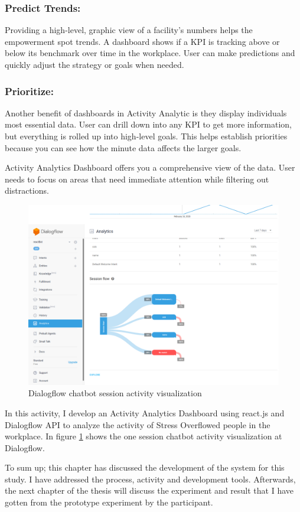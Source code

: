\subsubsection*{Predict Trends:}
Providing a high-level, graphic view of a facility’s numbers helps the empowerment spot trends. A dashboard shows if a \acs{KPI} is tracking above or below its benchmark over time in the workplace. User can make predictions and quickly adjust the strategy or goals when needed.
\subsubsection*{Prioritize:}
Another benefit of dashboards in Activity Analytic is they display individuals most essential data. User can drill down into any \acs{KPI} to get more information, but everything is rolled up into high-level goals. This helps establish priorities because you can see how the minute data affects the larger goals.

Activity Analytics Dashboard offers you a comprehensive view of the data. User needs to focus on areas that need immediate attention while filtering out distractions.

\begin{figure}[hbt!] 
  \centering
  \includegraphics[width=1.0\linewidth]{chap4/image4/flow2.png}
  \caption[Dialogflow chatbot session activity visualization ]{Dialogflow chatbot session activity visualization}
  \label{fig:flow2}
\end{figure}

In this activity, I develop an Activity Analytics Dashboard using react.js and Dialogflow API to analyze the activity of Stress Overflowed people in the workplace.  In figure \ref{fig:flow2} shows the one session chatbot activity visualization at Dialogflow.

To sum up; this chapter has discussed the development of the system for this study. I have addressed the process, activity and development tools. Afterwards, the next chapter of the thesis will discuss the experiment and result that I have gotten from the prototype experiment by the participant.


